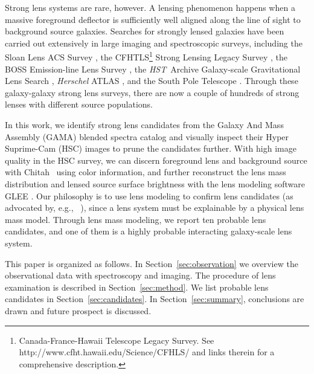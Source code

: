 \documentclass[apj]{emulateapj}
\def\hst{\textit{HST}}
\def\chitah{{\sc Chitah}}
\newcommand{\sref}[1]{Section~\ref{#1}}
\def\eg{{e.g.,}}
\begin{document}
Strong lens systems are rare, however. A lensing phenomenon happens 
when a massive foreground deflector is sufficiently well aligned along the line of sight to background source galaxies.
Searches for strongly lensed galaxies have been carried out extensively in large imaging and spectroscopic surveys, including 
the Sloan Lens ACS Survey \citep[SLACS; \eg][]{BoltonEtal06SLACS}, 
the CFHTLS\footnote{Canada-France-Hawaii Telescope Legacy Survey.  See http://www.cfht.hawaii.edu/Science/CFHLS/ and links therein for a comprehensive description.} 
Strong Lensing Legacy Survey \citep[SL2S; \eg][]{CabanacEtal07, GavazziEtal12,MoreEtal12, SonnenfeldEtal13a,SonnenfeldEtal13b},
the BOSS Emission-line Lens Survey \cite[BELLS; \eg][]{BrownsteinEtal12,BoltonEtal12a},
the \hst\ Archive Galaxy-scale Gravitational Lens Search \citep[HAGGLeS;][]{MarshallEtal09}, 
\textit{Herschel} ATLAS \citep[H-ATLAS; \eg][]{NegrelloEtal10,GonzalezNuevoEtal12}, and the South Pole Telescope \citep[SPT; \eg][]{VieiraEtal13,HezavehEtal13}. 
Through these galaxy-galaxy strong lens surveys, there are now a couple of hundreds of strong lenses with different source populations.

In this work, we identify strong lens candidates from the Galaxy And Mass Assembly (GAMA) blended spectra catalog \citep{HolwerdaEtal15} 
and visually inspect their Hyper Suprime-Cam (HSC) images to prune the candidates further. 
With high image quality in the HSC survey, we can discern foreground lens and background source with \chitah\ \citep{ChanEtal15} using color information, 
and further reconstruct the lens mass distribution and lensed source surface brightness  
with the lens modeling software GLEE  \citep{Suyu&Halkola10, SuyuEtal12}. 
Our philosophy is to use lens modeling to confirm lens candidates (as advocated by, \eg\ \citeauthor{MarshallEtal09} \citeyear{MarshallEtal09}), 
since a lens system must be explainable by a physical lens mass model. 
Through lens mass modeling, we report ten probable lens candidates, and one of them is a highly probable interacting galaxy-scale lens system.
 
This paper is organized as follows. 
In \sref{sec:observation} we overview the observational data with spectroscopy and imaging. 
The procedure of lens examination is described in \sref{sec:method}. 
We list probable lens candidates in \sref{sec:candidates}.
In \sref{sec:summary}, conclusions are drawn and future prospect is discussed. 

\end{document}
